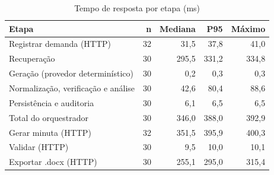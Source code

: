 \begin{table}[htbp]
\caption{Tempo de resposta por etapa (ms)}\label{tab:latencia}
\centering\small
\setlength{\tabcolsep}{4pt}
\begin{tabular}{lrrrr}
\toprule
Etapa & n & Mediana & P95 & Máximo \\
\midrule
Registrar demanda (HTTP) & 32 & 31,5 & 37,8 & 41,0 \\
Recuperação & 30 & 295,5 & 331,2 & 334,8 \\
Geração (provedor determinístico) & 30 & 0,2 & 0,3 & 0,3 \\
Normalização, verificação e análise & 30 & 42,6 & 80,4 & 88,6 \\
Persistência e auditoria & 30 & 6,1 & 6,5 & 6,5 \\
Total do orquestrador & 30 & 346,0 & 388,0 & 392,9 \\
Gerar minuta (HTTP) & 32 & 351,5 & 395,9 & 400,3 \\
Validar (HTTP) & 30 & 9,5 & 10,0 & 10,1 \\
Exportar .docx (HTTP) & 30 & 255,1 & 295,0 & 315,4 \\
\bottomrule
\end{tabular}
\end{table}
